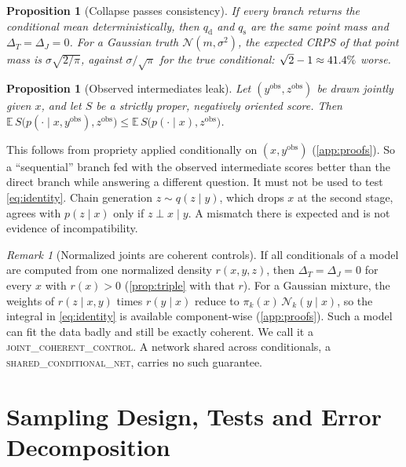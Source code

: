 \documentclass{article}
\theoremstyle{plain}
\newtheorem{proposition}[theorem]{Proposition}
\theoremstyle{definition}
\theoremstyle{remark}
\newtheorem{remark}[theorem]{Remark}
\newcommand{\E}{\mathbb{E}}
\newcommand{\qd}{q_{\mathrm{d}}}
\newcommand{\qs}{q_{\mathrm{s}}}
\begin{document}
\begin{proposition}[Collapse passes consistency]
\label{prop:collapse}
If every branch returns the conditional mean deterministically, then $\qd$ and $\qs$ are the same point mass and $\Delta_T=\Delta_J=0$.
For a Gaussian truth $\mathcal N(m,\sigma^2)$, the expected CRPS of that point mass is $\sigma\sqrt{2/\pi}$, against $\sigma/\sqrt{\pi}$ for the true conditional: $\sqrt2-1\approx41.4\%$ worse.
\end{proposition}

\begin{proposition}[Observed intermediates leak]
\label{prop:leak}
Let $(y^{\mathrm{obs}},z^{\mathrm{obs}})$ be drawn jointly given $x$, and let $S$ be a strictly proper, negatively oriented score.
Then $\E\,S\big(p(\cdot\mid x,y^{\mathrm{obs}}),z^{\mathrm{obs}}\big)\le\E\,S\big(p(\cdot\mid x),z^{\mathrm{obs}}\big)$.
\end{proposition}

This follows from propriety applied conditionally on $(x,y^{\mathrm{obs}})$ (\cref{app:proofs}).
So a ``sequential'' branch fed with the observed intermediate scores better than the direct branch while answering a different question. It must not be used to test \eqref{eq:identity}.
Chain generation $z\sim q(z\mid y)$, which drops $x$ at the second stage, agrees with $p(z\mid x)$ only if $z\perp x\mid y$. A mismatch there is expected and is not evidence of incompatibility.

\begin{remark}[Normalized joints are coherent controls]
\label{rem:coherent}
If all conditionals of a model are computed from one normalized density $r(x,y,z)$, then $\Delta_T=\Delta_J=0$ for every $x$ with $r(x)>0$ (\cref{prop:triple} with that $r$).
For a Gaussian mixture, the weights of $r(z\mid x,y)$ times $r(y\mid x)$ reduce to $\pi_k(x)\,\mathcal N_k(y\mid x)$, so the integral in \eqref{eq:identity} is available component-wise (\cref{app:proofs}).
Such a model can fit the data badly and still be exactly coherent. We call it a \textsc{joint\_coherent\_control}.
A network shared across conditionals, a \textsc{shared\_conditional\_net}, carries no such guarantee.
\end{remark}

\section{Sampling Design, Tests and Error Decomposition}
\label{sec:method}
\end{document}
